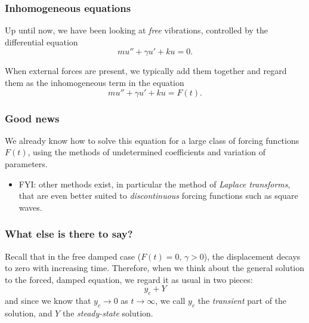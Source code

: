 \def\encoding{UTF-8}

\def\mytitle{Further investigation of harmonic vibration}
\def\affiliation{The College of Idaho}
\def\myauthor{Math 352 Differential Equations}
\def\mydate{19 April 2013}
\def\latexmode{beamer}

\def\htmlheaderlevel{2  \\
\# Forced oscillations}
\begin{frame}

\frametitle{Inhomogeneous equations}
\label{inhomogeneousequations}

Up until now, we have been looking at \emph{free} vibrations, controlled by the differential equation
\[
    mu'' + \gamma u' + ku = 0.
\]

When external forces are present, we typically add them together and regard them as the inhomogeneous term in the equation
\[
    mu'' + \gamma u' + ku = F(t).
\]

\end{frame}

\begin{frame}

\frametitle{Good news}
\label{goodnews}

We already know how to solve this equation for a large class of forcing functions $ F(t) $, using the methods of undetermined coefficients and variation of parameters.

\begin{itemize}
\item FYI: other methods exist, in particular the method of \emph{Laplace transforms}, that are even better suited to \emph{discontinuous} forcing functions such as square waves.

\end{itemize}

\end{frame}

\begin{frame}

\frametitle{What else is there to say?}
\label{whatelseistheretosay}

Recall that in the free damped case ($ F(t) = 0,\, \gamma > 0 $), the displacement decays to zero with increasing time. Therefore, when we think about the general solution to the forced, damped equation, we regard it as usual in two pieces:
\[
    y_c + Y
\]
and since we know that $ y_c \to 0 $ as $ t \to \infty $, we call $ y_c $ the \emph{transient} part of the solution, and $ Y $ the \emph{steady-state} solution. 

\end{frame}

